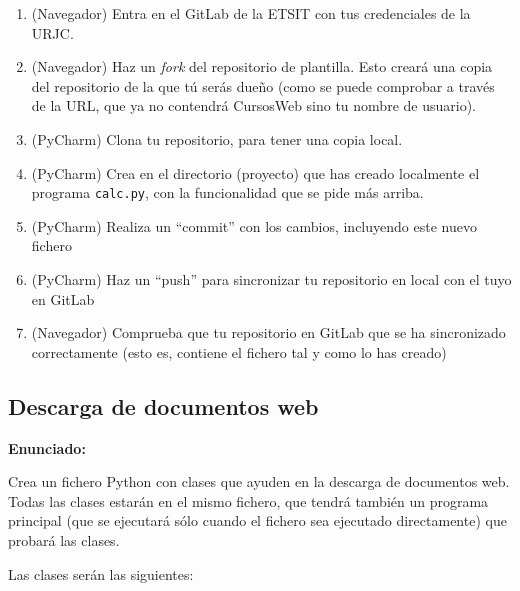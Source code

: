 \begin{enumerate}
  \item (Navegador) Entra en el GitLab de la ETSIT con tus credenciales de la URJC.
  \item (Navegador) Haz un \emph{fork} del repositorio de plantilla. Esto creará una copia del repositorio de la que tú serás dueño (como se puede comprobar a través de la URL, que ya no contendrá CursosWeb sino tu nombre de usuario).
  \item (PyCharm) Clona tu repositorio, para tener una copia local.
  \item (PyCharm) Crea en el directorio (proyecto) que has creado localmente el programa \texttt{calc.py}, con la funcionalidad que se pide más arriba.
  \item (PyCharm) Realiza un ``commit'' con los cambios, incluyendo este nuevo fichero
  \item (PyCharm) Haz un ``push'' para sincronizar tu repositorio en local con el tuyo en GitLab
  \item (Navegador) Comprueba que tu repositorio en GitLab que se ha sincronizado correctamente (esto es, contiene el fichero tal y como lo has creado)
\end{enumerate}


\subsection{Descarga de documentos web}
\label{subsec:eje-python-descarga-web}


\textbf{Enunciado:}

Crea un fichero Python con clases que ayuden en la descarga de documentos web. Todas las clases estarán en el mismo fichero, que tendrá también un programa principal (que se ejecutará sólo cuando el fichero sea ejecutado directamente) que probará las clases.

Las clases serán las siguientes:

